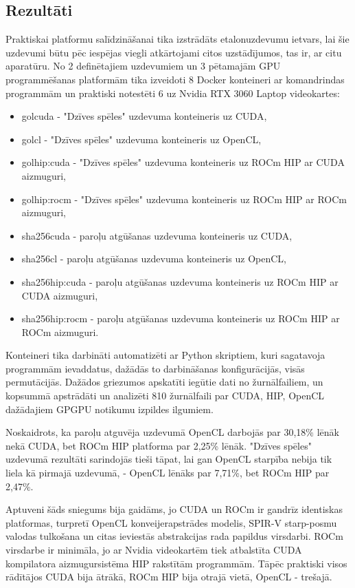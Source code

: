 \begin{center}
    \chapter{Rezultāti}
\end{center}

Praktiskai platformu salīdzināšanai tika izstrādāts etalonuzdevumu ietvars, 
lai šie uzdevumi būtu pēc iespējas viegli atkārtojami citos uzstādījumos, tas
ir, ar citu aparatūru. No 2 definētajiem uzdevumiem un 3 pētamajām GPU
programmēšanas platformām tika izveidoti 8 Docker konteineri ar komandrindas
programmām un praktiski notestēti 6 uz Nvidia RTX 3060 Laptop videokartes:
\begin{itemize}
    \setlength\itemsep{0pt}
    \item golcuda - "Dzīves spēles" uzdevuma konteineris uz CUDA,
    \item golcl - "Dzīves spēles" uzdevuma konteineris uz OpenCL,
    \item golhip:cuda - "Dzīves spēles" uzdevuma konteineris uz ROCm HIP ar CUDA aizmuguri,
    \item golhip:rocm - "Dzīves spēles" uzdevuma konteineris uz ROCm HIP ar ROCm aizmuguri,
    \item sha256cuda - paroļu atgūšanas uzdevuma konteineris uz CUDA,
    \item sha256cl - paroļu atgūšanas uzdevuma konteineris uz OpenCL,
    \item sha256hip:cuda - paroļu atgūšanas uzdevuma konteineris uz ROCm HIP ar CUDA aizmuguri,
    \item sha256hip:rocm - paroļu atgūšanas uzdevuma konteineris uz ROCm HIP ar ROCm aizmuguri.
\end{itemize}

Konteineri tika darbināti automatizēti ar Python skriptiem, kuri sagatavoja
programmām ievaddatus, dažādās to darbināšanas konfigurācijās, visās
permutācijās. Dažādos griezumos apskatīti iegūtie dati no žurnālfailiem, un
kopsummā apstrādāti un analizēti 810 žurnālfaili par CUDA, HIP, OpenCL
dažādajiem GPGPU notikumu izpildes ilgumiem.

Noskaidrots, ka paroļu atguvēja uzdevumā OpenCL darbojās par 30,18\% lēnāk nekā
CUDA, bet ROCm HIP platforma par 2,25\% lēnāk.
"Dzīves spēles" uzdevumā rezultāti sarindojās tieši tāpat, lai gan OpenCL
starpība nebija tik liela kā pirmajā uzdevumā, - OpenCL lēnāks par
7,71\%, bet ROCm HIP par 2,47\%.

Aptuveni šāds sniegums bija gaidāms, jo CUDA un ROCm ir gandrīz identiskas
platformas, turpretī OpenCL konveijerapstrādes modelis, SPIR-V starp-posmu
valodas tulkošana un citas ieviestās abstrakcijas rada papildus virsdarbi. ROCm
virsdarbe ir minimāla, jo ar Nvidia videokartēm tiek atbalstīta CUDA
kompilatora aizmugursistēma HIP rakstītām programmām. Tāpēc praktiski
visos rādītājos CUDA bija ātrākā, ROCm HIP bija otrajā vietā, OpenCL - trešajā.

